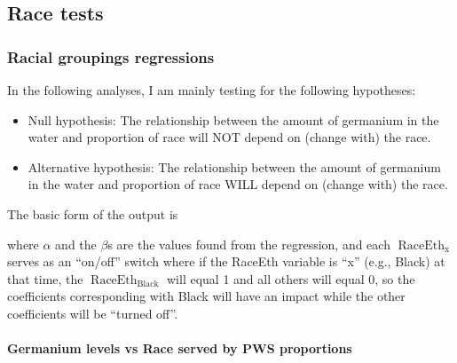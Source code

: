 \documentclass[
  letterpaper,
  DIV=11,
  numbers=noendperiod]{scrartcl}
\let\oldparagraph\paragraph
\renewcommand{\paragraph}[1]{\oldparagraph{#1}\mbox{}}
\providecommand{\tightlist}{%
  \setlength{\itemsep}{0pt}\setlength{\parskip}{0pt}}\usepackage{longtable,booktabs,array}
\begin{document}
\hypertarget{race-tests}{%
\subsection{Race tests}\label{race-tests}}

\hypertarget{racial-groupings-regressions}{%
\subsubsection{Racial groupings
regressions}\label{racial-groupings-regressions}}

In the following analyses, I am mainly testing for the following
hypotheses:

\begin{itemize}
\tightlist
\item
  Null hypothesis: The relationship between the amount of germanium in
  the water and proportion of race will NOT depend on (change with) the
  race.
\item
  Alternative hypothesis: The relationship between the amount of
  germanium in the water and proportion of race WILL depend on (change
  with) the race.
\end{itemize}

The basic form of the output is

where \(\alpha\) and the \(\beta\)s are the values found from the
regression, and each \(\operatorname{RaceEth}_{\operatorname{x}}\)
serves as an ``on/off'' switch where if the RaceEth variable is ``x''
(e.g., Black) at that time, the
\(\operatorname{RaceEth}_{\operatorname{Black}}\) will equal 1 and all
others will equal 0, so the coefficients corresponding with Black will
have an impact while the other coefficients will be ``turned off''.

\hypertarget{germanium-levels-vs-race-served-by-pws-proportions}{%
\paragraph{Germanium levels vs Race served by PWS
proportions}\label{germanium-levels-vs-race-served-by-pws-proportions}}
\end{document}

